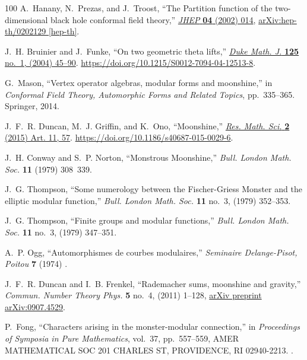 \begin{thebibliography}{100}
A.~Hanany, N.~Prezas, and J.~Troost, ``{The Partition function of the
  two-dimensional black hole conformal field theory},''
  \href{http://dx.doi.org/10.1088/1126-6708/2002/04/014}{{\em JHEP} {\bfseries
  04} (2002) 014},
\href{http://arxiv.org/abs/hep-th/0202129}{{\ttfamily arXiv:hep-th/0202129
  [hep-th]}}.

J.~H. Bruinier and J.~Funke, ``On two geometric theta lifts,''
  \href{http://dx.doi.org/10.1215/S0012-7094-04-12513-8}{{\em Duke Math. J.}
  {\bfseries 125} no.~1, (2004) 45--90}.
  \url{https://doi.org/10.1215/S0012-7094-04-12513-8}.

G.~Mason, ``Vertex operator algebras, modular forms and moonshine,'' in {\em
  Conformal Field Theory, Automorphic Forms and Related Topics}, pp.~335--365.
\newblock Springer, 2014.

J.~F.~R. Duncan, M.~J. Griffin, and K.~Ono, ``Moonshine,''
  \href{http://dx.doi.org/10.1186/s40687-015-0029-6}{{\em Res. Math. Sci.}
  {\bfseries 2} (2015) Art. 11, 57}.
  \url{https://doi.org/10.1186/s40687-015-0029-6}.

J.~H. Conway and S.~P. Norton, ``{Monstrous Moonshine},'' {\em Bull. London
  Math. Soc.} {\bfseries 11} (1979) 308~339.

J.~G. Thompson, ``Some numerology between the {F}ischer-{G}riess {M}onster and
  the elliptic modular function,'' {\em Bull. London Math. Soc.} {\bfseries 11}
  no.~3, (1979) 352--353.

J.~G. Thompson, ``Finite groups and modular functions,'' {\em Bull. London
  Math. Soc.} {\bfseries 11} no.~3, (1979) 347--351.

A.~P. Ogg, ``Automorphismes de courbes modulaires,'' {\em Seminaire
  Delange-Pisot, Poitou} {\bfseries 7} (1974) .

J.~F.~R. Duncan and I.~B. Frenkel, ``Rademacher sums, moonshine and gravity,''
  {\em Commun. Number Theory Phys.} {\bfseries 5} no.~4, (2011) 1--128,
  \href{http://arxiv.org/abs/arXiv preprint arXiv:0907.4529}{{\ttfamily arXiv
  preprint arXiv:0907.4529}}.

P.~Fong, ``Characters arising in the monster-modular connection,'' in {\em
  Proceedings of Symposia in Pure Mathematics}, vol.~37, pp.~557--559, AMER
  MATHEMATICAL SOC 201 CHARLES ST, PROVIDENCE, RI 02940-2213.
.


\end{thebibliography}
